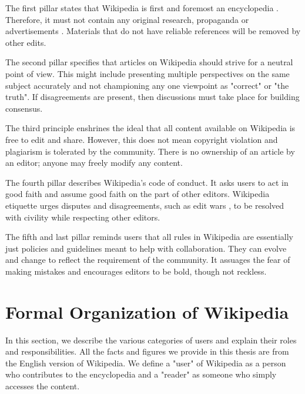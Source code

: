 The first pillar states that Wikipedia is first and foremost an encyclopedia \cite{wiki:wiki-is-not}. Therefore, it must not contain any original research, propaganda or advertisements \cite{wiki:wiki-NOR}. Materials that do not have reliable references will be removed by other edits.

The second pillar specifies that articles on Wikipedia should strive for a neutral point of view. This might include presenting multiple perspectives on the same subject accurately and not championing any one viewpoint as "correct" or "the truth". If disagreements are present, then discussions must take place for building consensus.

The third principle enshrines the ideal that all content available on Wikipedia is free to edit and share. However, this does not mean copyright violation and plagiarism is tolerated by the community. There is no ownership of an article by an editor; anyone may freely modify any content.

The fourth pillar describes Wikipedia's code of conduct. It asks users to act in good faith and assume good faith on the part of other editors. Wikipedia etiquette urges disputes and disagreements, such as edit wars \cite{wiki:edit-wars}, to be resolved with civility while respecting other editors.

The fifth and last pillar reminds users that all rules in Wikipedia are essentially just policies and guidelines meant to help with collaboration. They can evolve and change to reflect the requirement of the community. It assuages the fear of making mistakes and encourages editors to be bold, though not reckless. 

\section{Formal Organization of Wikipedia}
\label{sec:formal-org-wikipedia}
In this section, we describe the various categories of users and explain their roles and responsibilities. All the facts and figures we provide in this thesis are from the English version of Wikipedia. We define a "user" of Wikipedia as a person who contributes to the encyclopedia and a "reader" as someone who simply accesses the content.

